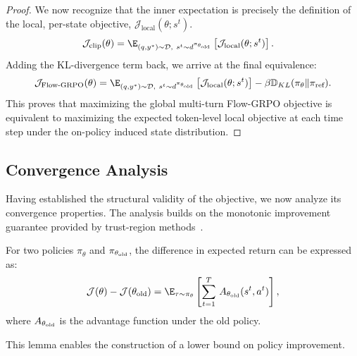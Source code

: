 \begin{proof}
We now recognize that the inner expectation is precisely the definition of the local, per-state objective, $\mathcal{J}_{\text{local}}(\theta; s^t)$.
\begin{align}
    \mathcal{J}_{\text{clip}}(\theta) &= \E_{(q,y^*) \sim \mathcal{D}, \ s^t \sim d^{\pi_{\theta_{\text{old}}}}} \left[ \mathcal{J}_{\text{local}}(\theta; s^t) \right].
\end{align}
Adding the KL-divergence term back, we arrive at the final equivalence:
\begin{equation}
    \mathcal{J}_{\text{Flow-GRPO}}(\theta) = \E_{(q,y^*) \sim \mathcal{D}, \ s^t \sim d^{\pi_{\theta_{\text{old}}}}} \left[ \mathcal{J}_{\text{local}}(\theta; s^t) \right] - \beta \mathbb{D}_{KL}(\pi_\theta \| \pi_{\text{ref}}).
\end{equation}
This proves that maximizing the global multi-turn Flow-GRPO objective is equivalent to maximizing the expected token-level local objective at each time step under the on-policy induced state distribution.
\end{proof}


\subsection{Convergence Analysis}
Having established the structural validity of the objective, we now analyze its convergence properties. 
The analysis builds on the monotonic improvement guarantee provided by trust-region methods~\citep{schulman2015trust}.

\begin{lemma}
For two policies $\pi_{\theta}$ and $\pi_{\theta_{\rm old}}$, the difference in expected return can be expressed as:
\begin{equation}
\mathcal{J}(\theta) - \mathcal{J}(\theta_{\rm old}) 
= \E_{\tau \sim \pi_{\theta}} \left[ \sum_{t=1}^{T} \, A_{\theta_{\rm old}}(s^t, a^t) \right],
\end{equation}
where $A_{\theta_{\rm old}}$ is the advantage function under the old policy.
\end{lemma}

This lemma enables the construction of a lower bound on policy improvement.

